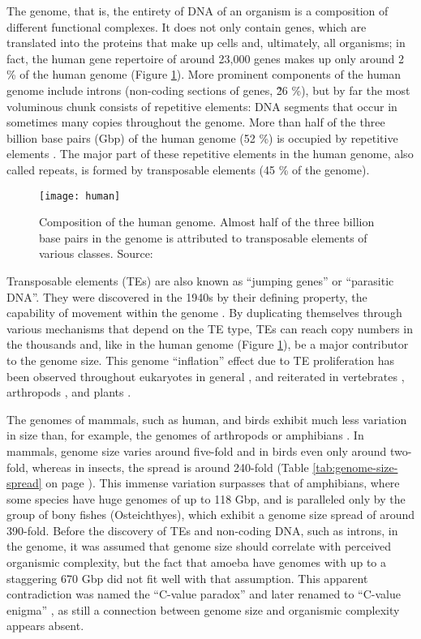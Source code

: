 The genome, that is, the entirety of DNA of an organism is a composition
of different functional complexes. It does not only contain genes, which
are translated into the proteins that make up cells and, ultimately, all
organisms; in fact, the human gene repertoire of around 23,000 genes
makes up only around 2 \% of the human genome \citep{Makalowski2001}
(Figure \ref{fig:human-genome}). More prominent components of the human
genome include introns (non-coding sections of genes, \~26 \%), but by
far the most voluminous chunk consists of repetitive elements: DNA
segments that occur in sometimes many copies throughout the genome.
More than half of the three billion base pairs (Gbp) of the human genome
(52 \%) is occupied by repetitive elements \citep{Lander2001}. The major
part of these repetitive elements in the human genome, also called
repeats, is formed by transposable elements (45 \% of the genome).

\begin{figure}
\centering
\texttt{[image: human]}
\caption{Composition of the human genome. Almost half of the three
billion base pairs in the genome is attributed to transposable elements
of various classes. Source: \citet{Lander2001}}
\label{fig:human-genome}
\end{figure}

Transposable elements (TEs) are also known as ``jumping genes'' or
``parasitic DNA''. They were discovered in the 1940s by their defining
property, the capability of movement within the genome
\citep{McClintock1950}. By duplicating themselves through various
mechanisms that depend on the TE type, TEs can reach copy numbers in the
thousands \citep{Petersen2018} and, like in the human genome (Figure
\ref{fig:human-genome}), be a major contributor to the genome size. This
genome ``inflation'' effect due to TE proliferation has been observed
throughout eukaryotes in general \citep{Chenais2012}, and reiterated in
vertebrates \citep{Chalopin2015}, arthropods \citep{Petersen2018}, and
plants \citep{Staton2015}. 

The genomes of mammals, such as human, and birds exhibit much less
variation in size than, for example, the genomes of arthropods or 
amphibians \citep{Gregory2005}. In mammals, genome size varies around
five-fold and in birds even only around two-fold, whereas in insects,
the spread is around 240-fold (Table \ref{tab:genome-size-spread} on page
\pageref{tab:genome-size-spread}). This immense variation surpasses that
of amphibians, where some species have huge genomes of up to 118 Gbp, and
is paralleled only by the group of bony fishes (Osteichthyes), which
exhibit a genome size spread of around 390-fold. Before the discovery of
TEs and non-coding DNA, such as introns, in the genome, it was assumed
that genome size should correlate with perceived organismic complexity,
but the fact that amoeba have genomes with up to a staggering 670 Gbp
\citep{Parfrey2008} did not fit well with that assumption. This apparent
contradiction was named the ``C-value paradox'' and later renamed to
``C-value enigma'' \citep{Gregory2007}, as still a connection between
genome size and organismic complexity appears absent.

